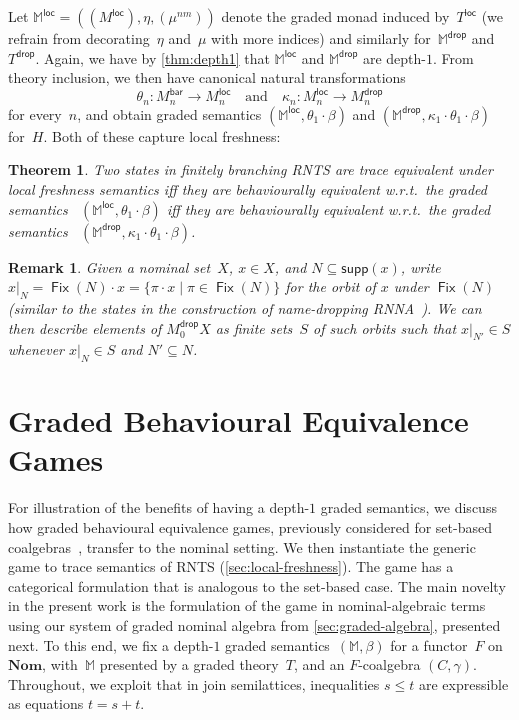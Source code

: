 \documentclass[11pt,a4paper]{amsart}
\newtheorem{theorem}{Theorem}[section]
\newtheorem{remark}[remark]{Remark}
\newcommand{\Br}{\mathsf{bar}}
\newcommand{\loc}{\mathsf{loc}}
\newcommand{\drop}{\mathsf{drop}}
\newcommand{\supp}{\mathsf{supp}}
\newcommand{\Fix}{\mathop{\mathsf{Fix}}}
\theoremstyle{plain}
\numberwithin{equation}{section}
\newcommand{\monad}{{\mathbb{M}}}
\newcommand{\+}[1]{\mathcal{#1}\xspace}
\newcommand{\Nom}{\mathbf{Nom}}
\theoremstyle{definition}
\begin{document}
Let $\monad^\loc=((M^\loc),\eta,(\mu^{nm}))$ denote the graded monad
induced by~$T^\loc$ (we refrain from decorating~$\eta$ and~$\mu$ with
more indices) and similarly for~$\monad^\drop$ and $T^\drop$. Again,
we have by \cref{thm:depth1} that $\monad^\loc$ and $\monad^\drop$ are
depth-$1$. From theory inclusion, we then have canonical natural
transformations
\begin{equation*}
  \theta_n\colon M_n^\Br \to M_n^\loc\quad \text{and}\quad\kappa_n\colon M_n^\loc \to M_n^\drop
\end{equation*}
for every~$n$, and obtain graded semantics
$(\monad^\loc,\theta_1\cdot\beta)$ and
$(\monad^\drop,\kappa_1\cdot\theta_1\cdot\beta)$
for~$H$. Both of these capture local freshness:
\begin{theorem}\label{thm:local-freshness}
  Two states in finitely branching RNTS are trace equivalent under
  local freshness semantics iff they are behaviourally equivalent
  w.r.t.~the graded semantics \mbox{
    $(\monad^\loc,\theta_1\cdot\beta)$} iff they are behaviourally
  equivalent w.r.t.~the graded semantics \mbox{
    $(\monad^\drop,\kappa_1\cdot\theta_1\cdot\beta)$}.
\end{theorem}
\begin{remark}
  \label{rem:namerestrictionmodel}
  Given a nominal set~$X$, $x\in X$, and $N \subseteq \supp(x)$, write
  $x|_N = \Fix(N) \cdot x = \{\pi \cdot x \mid \pi \in \Fix(N)\}$ for
  the orbit of $x$ under $\Fix(N)$ (similar to the states in the
  construction of name-dropping RNNA~\cite{SchroderEA17}). We can
  then describe elements of $M^\drop_0X$ as finite sets~$S$ of such
  orbits such that $x|_{N'} \in S$ whenever $x|_N \in S$ and
  $N' \subseteq N$.
\end{remark}



\section{Graded Behavioural Equivalence Games}
\label{sec:games}

For illustration of the benefits of having a depth-$1$ graded
semantics, we discuss how graded behavioural equivalence games,
previously considered for set-based coalgebras~\cite{FordEA22},
transfer to the nominal setting. We then instantiate the generic game
to trace semantics of RNTS (\cref{sec:local-freshness}). The game has
a categorical formulation that is analogous to the set-based case.  %
The main novelty in the present work is the
formulation of the game in nominal-algebraic terms using our system of
graded nominal algebra from \cref{sec:graded-algebra}, presented
next. To this end, we fix a depth-$1$ graded
semantics~$(\monad,\beta)$ for a functor~$F$ on~$\Nom$, with~$\monad$
presented by a graded theory~$T$, and an $F$-coalgebra
$(C,\gamma)$. Throughout, we exploit that in join semilattices,
inequalities $s\le t$ are expressible as equations $t=s+t$.
\end{document}
